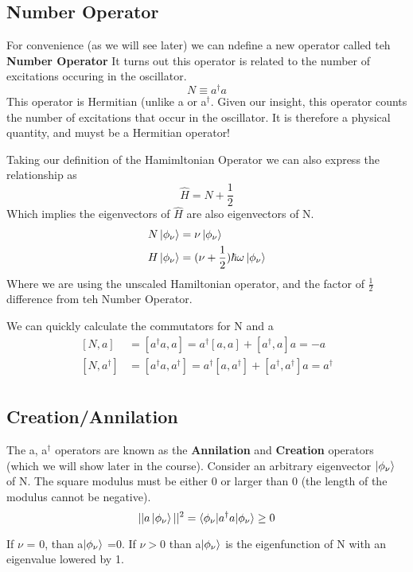 \documentclass{article}
\newcommand{\be}{\begin{equation}}
\newcommand{\ee}{\end{equation}}
\newcommand{\dg}{\dagger}
\begin{document}
\subsection*{Number Operator}
For convenience (as we will see later) we can ndefine a new operator called teh \textbf{Number Operator}
It turns out this operator is related to the number of excitations occuring in the oscillator. 
\be
N \equiv a^\dg a
\ee
This operator is Hermitian (unlike a or a$^\dg$.
Given our insight, this operator counts the number of excitations that occur in the oscillator.
It is therefore a physical quantity, and muyst be a Hermitian operator!	

Taking our definition of the Hamimltonian Operator we can also express the relationship as
\be
\hat{H} = N + \frac{1}{2}
\ee
Which implies the eigenvectors of $\hat{H}$ are also eigenvectors of N. 
\be
\begin{split}
N\ket{\phi_\nu} &= \nu \ket{\phi_\nu}\\
H\ket{\phi_\nu} &= (\nu+\frac{1}{2})\hbar\omega \ket{\phi_\nu}\\
\end{split}
\ee
Where we are using the unscaled Hamiltonian operator, and the factor of $\frac{1}{2}$ difference from teh Number Operator.

We can quickly calculate the commutators for N and a
\be
\begin{split}
[N,a] &= [a^\dg a, a] = a^\dg[a,a] + [a^\dg,a]a = -a\\
[N,a^\dg] &= [a^\dg a, a^\dg] = a^\dg[a,a^\dg] + [a^\dg,a^\dg]a = a^\dg\\
\end{split}
\ee

\subsection*{Creation/Annilation}
The a, a$^\dg$ operators are known as the \textbf{Annilation} and \textbf{Creation} operators (which we will show later in the course).
Consider an arbitrary eigenvector $\ket{\phi_\nu}$ of N.
The square modulus must be either 0 or larger than 0 (the length of the modulus cannot be negative).
\be
||a\ket{\phi_\nu}||^2 = \braket{\phi_\nu|a^\dg a| \phi_\nu} \geq 0
\ee

If $\nu$ = 0, than a$\ket{\phi_\nu}$ =0.
If $\nu > 0$ than a$\ket{\phi_\nu}$ is the eigenfunction of N with an eigenvalue lowered by 1. 
\end{document}
